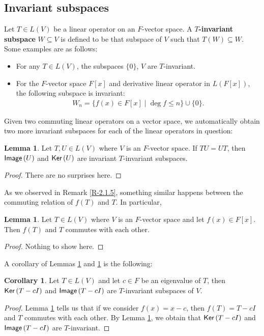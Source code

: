 \documentclass[letterpaper,11pt,twoside]{article}
\theoremstyle{definition}
\theoremstyle{definition}
\theoremstyle{definition}
\theoremstyle{definition}
\newtheorem{lemma}[proposition]{\textbf{Lemma}}
\theoremstyle{definition}
\theoremstyle{definition}
\theoremstyle{remark}
\theoremstyle{definition}
\newtheorem{corollary}[proposition]{Corollary}
\newcommand{\Ker}[1]{{\fontfamily{lmss}\selectfont 
		\text{Ker}\left (#1\right )
}}
\newcommand{\Image}[1]{{\fontfamily{lmss}\selectfont 
		\text{Image}\left (#1\right )
}}
\begin{document}
    \subsection{Invariant subspaces}
    Let $T\in L(V)$ be a linear operator on an $F$-vector space. A \textbf{$T$-invariant subspace} $W\subseteq V$ is defined to be that subspace of $V$ such that $T(W) \subseteq W$. Some examples are as follows:
    \begin{itemize}
        \item {For any $T\in L(V)$, the subspaces $\{0\}$, $V$ are $T$-invariant.}
        \item {For the $F$-vector space $F[x]$ and derivative linear operator in $L(F[x])$, the following subspace is invariant:
        \begin{align*}
            W_n = \{f(x) \in F[x]\;\vert\; \deg f \le n\}\cup \{0\}.
        \end{align*}}
    \end{itemize}
    Given two commuting linear operators on a vector space, we automatically obtain two more invariant subspaces for each of the linear operators in question:
    \begin{lemma}\label{L-2.2.1}
    Let $T,U \in L(V)$ where $V$ is an $F$-vector space. If $TU = UT$, then $\Image{U}$ and $\Ker{U}$ are invariant $T$-invariant subspaces.
    \end{lemma}
    \begin{proof}
     There are no surprises here.
    \end{proof}
    As we observed in Remark \ref{R-2.1.5}, something similar happens between the commuting relation of $f(T)$ and $T$. In particular,
    \begin{lemma}\label{L-2.2.2}
    Let $T\in L(V)$ where $V$ is an $F$-vector space and let $f(x) \in F[x]$. Then $f(T)$ and $T$ commutes with each other.
    \end{lemma}
    \begin{proof}
    Nothing to show here.
    \end{proof}
    A corollary of Lemmas \ref{L-2.2.1} and \ref{L-2.2.2} is the following:
    \begin{corollary}
    Let $T \in L(V)$ and let $c\in F$ be an eigenvalue of $T$, then $\Ker{T-cI}$ and $\Image{T-cI}$ are $T$-invariant subspaces of $V$.
    \end{corollary}
    \begin{proof}
    Lemma \ref{L-2.2.2} tells us that if we consider $f(x) = x-c$, then $f(T) = T-cI$ and $T$ commutes with each other. By Lemma \ref{L-2.2.1}, we obtain that $\Ker{T-cI}$ and $\Image{T-cI}$ are $T$-invariant.
    \end{proof}
\end{document}

